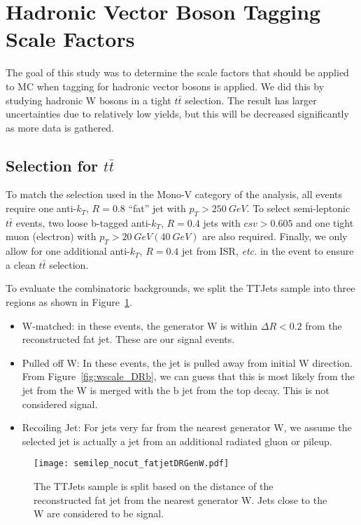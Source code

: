\documentclass{article}
\begin{document}
\section{Hadronic Vector Boson Tagging Scale Factors} \label{sec:wscale}

The goal of this study was to determine the scale factors that should
be applied to MC when tagging for hadronic vector bosons is applied.
We did this by studying hadronic W bosons in a tight $t\bar{t}$ selection.
The result has larger uncertainties due to relatively low yields,
but this will be decreased significantly as more data is gathered.

\subsection{Selection for $t\bar{t}$} \label{sec:wscale_selection}

To match the selection used in the Mono-V category of the analysis,
all events require one anti-$k_T$, $R = 0.8$ ``fat'' jet with $p_T > \SI{250}{GeV}$.
To select semi-leptonic $t\bar{t}$ events, two loose b-tagged anti-$k_T$, $R = 0.4$
jets with $csv > 0.605$ and one tight muon (electron) with
$p_T > \SI{20}{GeV} (\SI{40}{GeV})$ are also required.
Finally, we only allow for one additional anti-$k_T$, $R = 0.4$ jet from ISR, \emph{etc.}
in the event to ensure a clean $t\bar{t}$ selection.

To evaluate the combinatoric backgrounds, we split the TTJets sample into three regions
as shown in Figure~\ref{fig:wscale_DRGen}.
\begin{itemize}
\item W-matched: in these events, the generator W is within $\Delta R < 0.2$ from the
  reconstructed fat jet. These are our signal events.
\item Pulled off W: In these events, the jet is pulled away from initial W direction.
  From Figure~\ref{fig:wscale_DRb}, we can guess that this is most likely from the jet from
  the W is merged with the b jet from the top decay.
  This is not considered signal.
\item Recoiling Jet: For jets very far from the nearest generator W, we assume the selected
  jet is actually a jet from an additional radiated gluon or pileup.
\end{itemize}

\begin{figure}[h]
  \centering
  \texttt{[image: semilep\_nocut\_fatjetDRGenW.pdf]}
  \caption{The TTJets sample is split based on the distance of the reconstructed fat jet
  from the nearest generator W. Jets close to the W are considered to be signal.}
  \label{fig:wscale_DRGen}
\end{figure}
\end{document}
